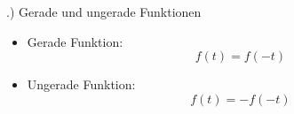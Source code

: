\documentclass[t,14pt]{beamer}
\begin{document}
\begin{frame}{\thesection .) Gerade und ungerade Funktionen}
        \begin{itemize}
            \item \alert{Gerade Funktion:} 
            \[
            f(t)=f(-t)
            \]
            \begin{center}
            \end{center}
            \item \alert{Ungerade Funktion:} 
            \[
            f(t)=-f(-t)
            \]
            \begin{center}
            \end{center}
        \end{itemize}
\end{frame}




\end{document}
